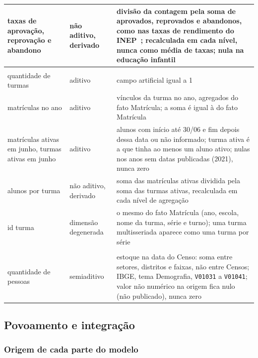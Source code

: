 \documentclass[11pt,a4paper]{article}
\newcommand{\cod}[1]{\texttt{#1}}
\begin{document}
\begin{longtable}{>{\raggedright}p{4.0cm}>{\raggedright}p{2.4cm}>{\raggedright\arraybackslash}p{8.05cm}}
taxas de aprovação, reprovação e abandono & não aditivo, derivado & divisão da contagem pela soma de aprovados, reprovados e abandonos, como nas taxas de rendimento do INEP~\cite{inep-rendimento}; recalculada em cada nível, nunca como média de taxas; nula na educação infantil \\
\midrule
\multicolumn{3}{l}{\textit{Tabela de fatos Ocupação de Turma}}\\
quantidade de turmas & aditivo & campo artificial igual a 1 \\
matrículas no ano & aditivo & vínculos da turma no ano, agregados do fato Matrícula; a soma é igual à do fato Matrícula \\
matrículas ativas em junho, turmas ativas em junho & aditivo & alunos com início até 30/06 e fim depois dessa data ou não informado; turma ativa é a que tinha ao menos um aluno ativo; nulas nos anos sem datas publicadas (2021), nunca zero \\
alunos por turma & não aditivo, derivado & soma das matrículas ativas dividida pela soma das turmas ativas, recalculada em cada nível de agregação \\
id turma & dimensão degenerada & o mesmo do fato Matrícula (ano, escola, nome da turma, série e turno); uma turma multisseriada aparece como uma turma por série \\
\midrule
\multicolumn{3}{l}{\textit{Tabela de fatos População}}\\
quantidade de pessoas & semiaditivo & estoque na data do Censo: soma entre setores, distritos e faixas, não entre Censos; IBGE, tema Demografia, \cod{V01031} a \cod{V01041}; valor não numérico na origem fica nulo (não publicado), nunca zero \\
\end{longtable}
\addtocounter{table}{-1}

\subsection{Povoamento e integração}

\subsubsection{Origem de cada parte do modelo}
\end{document}
